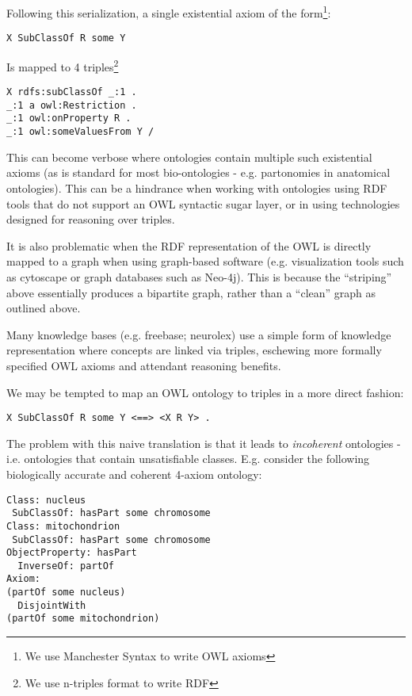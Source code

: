 \documentclass{my}
\begin{document}
Following this serialization, a single existential axiom of the
form\footnote{We use Manchester Syntax to write OWL axioms}:

\begin{verbatim}
X SubClassOf R some Y
\end{verbatim}

Is mapped to 4 triples\footnote{We use n-triples format to write RDF}

\begin{verbatim}
X rdfs:subClassOf _:1 .
_:1 a owl:Restriction .
_:1 owl:onProperty R .
_:1 owl:someValuesFrom Y /
\end{verbatim}

This can become verbose where ontologies contain multiple such
existential axioms (as is standard for most bio-ontologies -
e.g. partonomies in anatomical ontologies). This can be a hindrance
when working with ontologies using RDF tools that do not support an
OWL syntactic sugar layer, or in using technologies designed for
reasoning over triples.

It is also problematic when the RDF representation of the OWL is
directly mapped to a graph when using graph-based software
(e.g. visualization tools such as cytoscape or graph databases such as
Neo-4j). This is because the ``striping'' above essentially produces a
bipartite graph, rather than a ``clean'' graph as outlined above.


Many knowledge bases (e.g. freebase; neurolex) use a simple form of
knowledge representation where concepts are linked via triples,
eschewing more formally specified OWL axioms and attendant reasoning
benefits.

We may be tempted to map an OWL ontology to triples in a more direct
fashion:

\begin{verbatim}
X SubClassOf R some Y <==> <X R Y> .
\end{verbatim}

The problem with this naive translation is that it leads to
\emph{incoherent} ontologies - i.e. ontologies that contain
unsatisfiable classes. E.g. consider the following biologically
accurate and coherent 4-axiom ontology:

\begin{verbatim}
Class: nucleus
 SubClassOf: hasPart some chromosome
Class: mitochondrion 
 SubClassOf: hasPart some chromosome
ObjectProperty: hasPart
  InverseOf: partOf
Axiom:
(partOf some nucleus) 
  DisjointWith 
(partOf some mitochondrion)
\end{verbatim}
\end{document}
